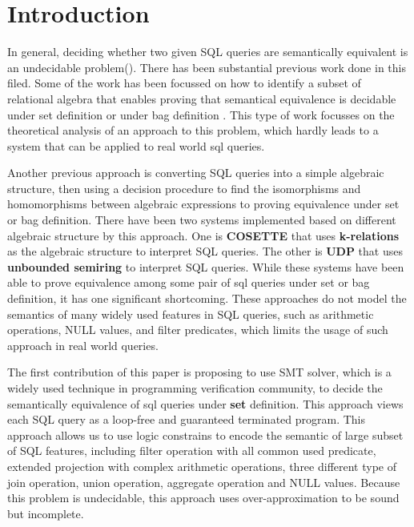 \section{Introduction}\label{sec:introduction}
%

In general, deciding whether two given SQL queries are semantically equivalent is an undecidable problem().
%
There has been substantial previous work done in this filed.
Some of the work has been focussed on how to identify a subset of relational algebra that enables proving that semantical equivalence is decidable 
under set definition  or under bag definition .
%
This type of work focusses on the theoretical analysis of an approach to this problem, which hardly leads to a system that can be applied to real world sql queries.
%

Another previous approach is converting SQL queries into a simple algebraic structure, 
then using a decision procedure to find the isomorphisms and homomorphisms between algebraic expressions to proving equivalence under set or bag definition.
%
There have been two systems implemented based on different algebraic structure by this approach.
%
One is \textbf{COSETTE}  that uses \textbf{k-relations} as the algebraic structure to interpret SQL queries.
%
The other is \textbf{UDP}  that uses \textbf{unbounded semiring} to interpret SQL queries.
While these systems have been able to prove equivalence among some pair of sql queries under set or bag definition, it has one significant shortcoming.
%
These approaches do not model the semantics of many widely used features in SQL queries, such as arithmetic operations, NULL values, and filter predicates,
which limits the usage of such approach in real world queries.
%

The first contribution of this paper is proposing to use SMT solver, which is a widely used technique in programming verification community, 
to decide the semantically equivalence of sql queries under \textbf{set} definition.
%
This approach views each SQL query as a loop-free and guaranteed terminated program. 
%
This approach allows us to use logic constrains to encode the semantic of large subset of SQL features,
including filter operation with all common used predicate, extended projection with complex arithmetic operations, three different type of join operation, union operation, aggregate
operation and NULL values.
%
Because this problem is undecidable, this approach uses over-approximation to be sound but incomplete.
%

